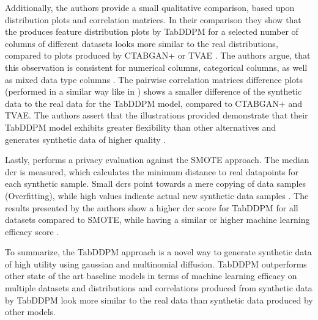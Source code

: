 Additionally, the authors provide a small qualitative comparison, based upon distribution plots and correlation matrices.
In their comparison they show that the produces feature distribution plots by TabDDPM for a selected number of columns of different datasets looks more similar 
to the real distributions, compared to plots produced by CTABGAN+ or TVAE \cite{kotelnikov2022TabDDPMModellingTabular}.
The authors argue, that this observation is consistent for numerical columns, categorical columns, as well as mixed data type columns \cite{kotelnikov2022TabDDPMModellingTabular}.
The pairwise correlation matrices difference plots (performed in a similar way like in \cite{brenninkmeijer2019GenerationEvaluationTabular}) shows a smaller difference of the synthetic data to the real data for the TabDDPM model, compared to CTABGAN+ and TVAE.
The authors assert that the illustrations provided demonstrate that their TabDDPM model exhibits greater flexibility than other alternatives and generates synthetic data of higher quality \cite{kotelnikov2022TabDDPMModellingTabular}.

Lastly, \cite{kotelnikov2022TabDDPMModellingTabular} performs a privacy evaluation against the SMOTE approach.
The median \gls{dcr} is measured, which calculates the minimum distance to real datapoints for each synthetic sample.
Small \glspl{dcr} point towards a mere copying of data samples (Overfitting), while high values indicate actual new synthetic data samples \cite{kotelnikov2022TabDDPMModellingTabular}.
The results presented by the authors show a higher \gls{dcr} score for TabDDPM for all datasets compared to SMOTE, while having a similar or higher machine learning efficacy score \cite{kotelnikov2022TabDDPMModellingTabular}.

To summarize, the TabDDPM approach is a novel way to generate synthetic data of high utility using gaussian and multinomial diffusion.
TabDDPM outperforms other state of the art baseline models in terms of machine learning efficacy on multiple datasets and distributions and correlations produced from synthetic data by TabDDPM look more similar to the real data than synthetic data produced by other models.





